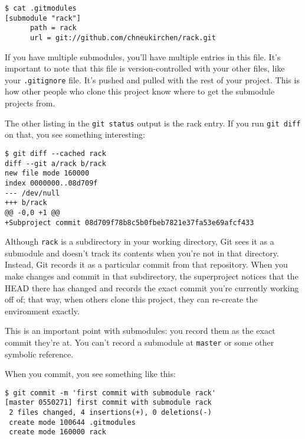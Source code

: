 \documentclass[a4paper]{book}
\begin{document}
\begin{shaded}\begin{verbatim}
$ cat .gitmodules
[submodule "rack"]
      path = rack
      url = git://github.com/chneukirchen/rack.git
\end{verbatim}\end{shaded}

If you have multiple submodules, you'll have multiple entries in this file. It's important to note that this file is version-controlled with your other files, like your \texttt{.gitignore} file. It's pushed and pulled with the rest of your project. This is how other people who clone this project know where to get the submodule projects from.

The other listing in the \texttt{git status} output is the rack entry. If you run \texttt{git diff} on that, you see something interesting:

\begin{shaded}\begin{verbatim}
$ git diff --cached rack
diff --git a/rack b/rack
new file mode 160000
index 0000000..08d709f
--- /dev/null
+++ b/rack
@@ -0,0 +1 @@
+Subproject commit 08d709f78b8c5b0fbeb7821e37fa53e69afcf433
\end{verbatim}\end{shaded}

Although \texttt{rack} is a subdirectory in your working directory, Git sees it as a submodule and doesn't track its contents when you're not in that directory. Instead, Git records it as a particular commit from that repository. When you make changes and commit in that subdirectory, the superproject notices that the HEAD there has changed and records the exact commit you're currently working off of; that way, when others clone this project, they can re-create the environment exactly.

This is an important point with submodules: you record them as the exact commit they're at. You can't record a submodule at \texttt{master} or some other symbolic reference.

When you commit, you see something like this:

\begin{shaded}\begin{verbatim}
$ git commit -m 'first commit with submodule rack'
[master 0550271] first commit with submodule rack
 2 files changed, 4 insertions(+), 0 deletions(-)
 create mode 100644 .gitmodules
 create mode 160000 rack
\end{verbatim}\end{shaded}
\end{document}
